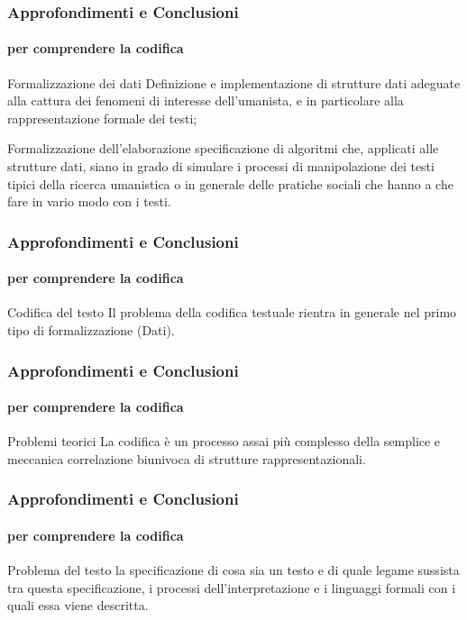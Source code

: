 \begin{frame}
	\frametitle{Approfondimenti e Conclusioni}
	\framesubtitle{per comprendere la codifica}
	\addtocounter{nframe}{1}

	\begin{block}{Formalizzazione dei dati}
		Definizione e implementazione di strutture dati adeguate alla cattura dei fenomeni di interesse dell’umanista, e in particolare alla rappresentazione formale dei testi;
	\end{block}

	\begin{block}{Formalizzazione dell'elaborazione}
		specificazione di algoritmi che, applicati alle strutture dati, siano in grado di simulare i processi di manipolazione dei testi tipici della ricerca umanistica o in generale delle pratiche sociali che hanno a che fare in vario modo con i testi.
	\end{block}

\end{frame}


\begin{frame}
	\frametitle{Approfondimenti e Conclusioni}
	\framesubtitle{per comprendere la codifica}
	\addtocounter{nframe}{1}

	\begin{block}{Codifica del testo}
		Il problema della codifica testuale rientra in generale nel primo tipo di formalizzazione (Dati).
	\end{block}

\end{frame}

\begin{frame}
	\frametitle{Approfondimenti e Conclusioni}
	\framesubtitle{per comprendere la codifica}
	\addtocounter{nframe}{1}

	\begin{block}{Problemi teorici}
		La codifica è un processo assai più complesso della semplice e meccanica correlazione biunivoca di strutture rappresentazionali.
	\end{block}

\end{frame}

\begin{frame}
	\frametitle{Approfondimenti e Conclusioni}
	\framesubtitle{per comprendere la codifica}
	\addtocounter{nframe}{1}

	\begin{block}{Problema del testo}
		la specificazione di cosa sia un testo e di quale legame sussista tra questa specificazione, i processi dell’interpretazione e i linguaggi formali con i quali essa viene descritta.
	\end{block}

\end{frame}

